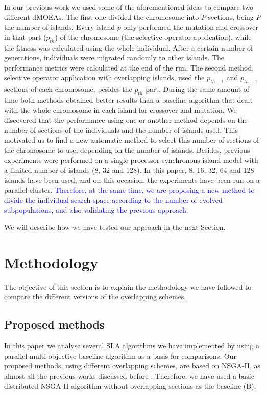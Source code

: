 \documentclass[preprint]{elsarticle}
\begin{document}
In our previous work \citep{Garcia16hpmoon} we used some of
the aforementioned ideas to compare two different dMOEAs. The first
one divided the chromosome into $P$ sections, being $P$ the number of
islands. Every island $p$ only performed the mutation and crossover in
that part ($p_{th}$) of the chromosome (the selective operator application), while the fitness was
calculated using the whole individual. After a certain number of
generations, individuals were migrated randomly to other islands. The
performance metrics were calculated at the end of the run. The second
method, selective operator application with overlapping islands, used the $p_{th-1}$ and
$p_{th+1}$ sections of each chromosome, besides the $p_{th}$
part. During the same amount of time both methods obtained better
results than a baseline algorithm that dealt with the whole chromosome
in each island for crossover and mutation. We discovered that the
performance using one or another method depends on the number of
sections of the individuals and the number of islands used. This
motivated us to find a new automatic method to select this number of
sections of the chromosome to use, depending on the number of
islands. Besides, previous experiments were performed on a single
processor synchronous island model with a limited number of islands
(8, 32 and 128). In this paper,  8, 16, 32, 64 and 128 islands have
been used, and on this occasion, the experiments have been run on a parallel
cluster. 
\textcolor{blue}{Therefore, at the same time, we are proposing a new method to divide the individual search space according to the number of evolved subpopulations, and also validating the previous approach.}


We will describe how we have tested our approach in the next Section.




%
%

\section{Methodology} 
\label{sec:methodology}

The objective of this section is to explain the methodology we have followed to
compare the different versions of the overlapping schemes.

\subsection{Proposed methods}
In this paper we analyse several SLA algorithms we have
implemented by using a parallel multi-objective baseline algorithm
as a basis for comparisons. Our proposed methods, using different overlapping schemes, %
are based on NSGA-II, as almost all the previous works discussed
before
\cite{Dorronsoro13superlinear,Durillo08masterslave,Hiroyasu07discussion,Deb03distributed,Xiao03specialized,Wang09parallel,Martens13asynchronous}. %
Therefore, we have used a basic distributed NSGA-II algorithm without
overlapping sections as the baseline (B).
\end{document}
